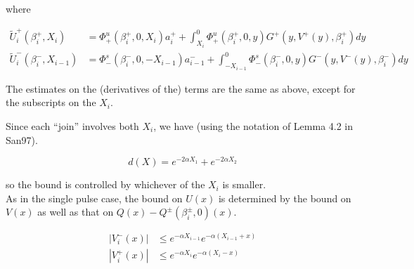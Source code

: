 \documentclass[12pt]{article}
\begin{document}
where

\begin{align*}
\tilde{U}_i^+(\beta_i^+, X_i) &= \Phi^u_+(\beta_i^+, 0, X_i) a_i^+ + \int_{X_i}^0 \Phi_+^u(\beta_i^+, 0, y) G^+(y, V^+(y),\beta_i^+)dy \\ 
\tilde{U}_i^-(\beta_i^-, X_{i-1}) &= \Phi^s_-(\beta_i^-, 0, -X_{i-1}) a_{i-1}^- + \int_{-X_{i-1}}^0 \Phi_-^s(\beta_i^-, 0, y) G^-(y, V^-(y),\beta_i^-)dy 
\end{align*}

The estimates on the (derivatives of the) terms are the same as above, except for the subscripts on the $X_i$. 

Since each ``join'' involves both $X_i$, we have (using the notation of Lemma 4.2 in San97). 

\[
d(X) = e^{-2 \alpha X_1} + e^{-2 \alpha X_2}
\]

so the bound is controlled by whichever of the $X_i$ is smaller. \\

As in the single pulse case, the bound on $U(x)$ is determined by the bound on $V(x)$ as well as that on $Q(x) - Q^\pm(\beta_i^\pm, 0)(x)$.

\begin{align*}
|V_i^-(x)| &\leq e^{-\alpha X_{i-1}} e^{-\alpha(X_{i-1} + x)} \\
|V_i^+(x)| &\leq e^{-\alpha X_i} e^{-\alpha(X_i - x)} \\
\end{align*}
\end{document}
